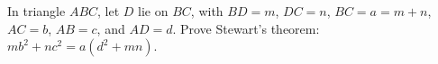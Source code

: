 In triangle $ABC$, let $D$ lie on $BC$, with $BD=m$, $DC=n$, $BC=a=m+n$, $AC=b$, $AB=c$, and $AD=d$. Prove Stewart's theorem: $mb^2+nc^2=a(d^2+mn)$.
